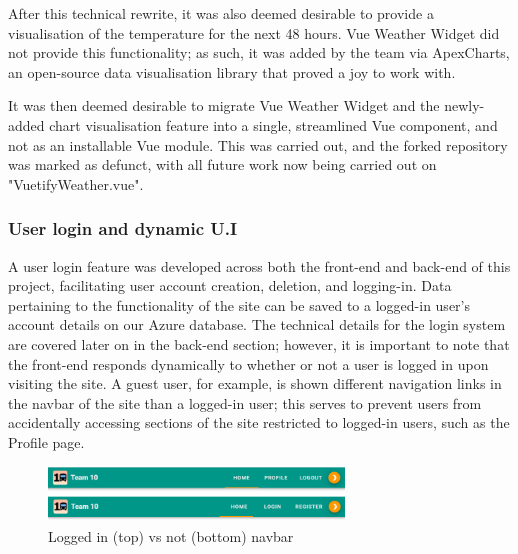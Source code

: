 \documentclass[]{UCD_CS_47360_Report}
\begin{document}
After this technical rewrite, it was also deemed desirable to provide a visualisation of the temperature for the next 48 hours. Vue Weather Widget did not provide this functionality; as such, it was added by the team via ApexCharts, an open-source data visualisation library that proved a joy to work with.

It was then deemed desirable to migrate Vue Weather Widget and the newly-added chart visualisation feature into a single, streamlined Vue component, and not as an installable Vue module. This was carried out, and the forked repository was marked as defunct, with all future work now being carried out on "VuetifyWeather.vue". %


\subsubsection{User login and dynamic U.I}
A user login feature was developed across both the front-end and back-end of this project, facilitating user account creation, deletion, and logging-in. Data pertaining to the functionality of the site can be saved to a logged-in user's account details on our Azure database. The technical details for the login system are covered later on in the back-end section; however, it is important to note that the front-end responds dynamically to whether or not a user is logged in upon visiting the site. A guest user, for example, is shown different navigation links in the navbar of the site than a logged-in user; this serves to prevent users from accidentally accessing sections of the site restricted to logged-in users, such as the Profile page.

\begin{figure}[!htb]
    \centering
    \includegraphics[width=0.7\textwidth]{figures/loggedInExample.png}
    \caption{Logged in (top) vs not (bottom) navbar}
    \label{fig:NavbarLoggedIn}
\end{figure}
\end{document}
